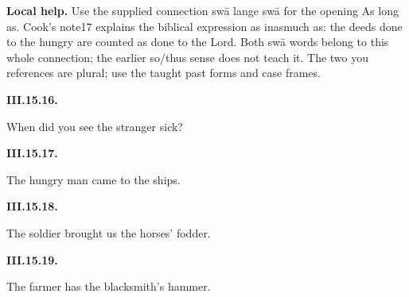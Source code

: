 \textbf{Local help.} Use the supplied connection swā lange swā for the opening As long as. Cook’s note17 explains the biblical expression as inasmuch as: the deeds done to the hungry are counted as done to the Lord. Both swā words belong to this whole connection; the earlier so/\allowbreak{}thus sense does not teach it. The two you references are plural; use the taught past forms and case frames.

\par\begin{minipage}{\linewidth}\raggedright
\textbf{III.15.16.}

When did you see the stranger sick?

\end{minipage}\par\addvspace{4pt}

\par\begin{minipage}{\linewidth}\raggedright
\textbf{III.15.17.}

The hungry man came to the ships.

\end{minipage}\par\addvspace{4pt}

\par\begin{minipage}{\linewidth}\raggedright
\textbf{III.15.18.}

The soldier brought us the horses’ fodder.

\end{minipage}\par\addvspace{4pt}

\par\begin{minipage}{\linewidth}\raggedright
\textbf{III.15.19.}

The farmer has the blacksmith’s hammer.

\end{minipage}\par\addvspace{4pt}

